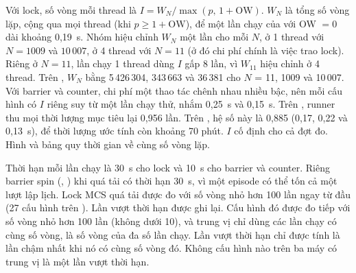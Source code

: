 Với lock, số vòng mỗi thread là $I = W_N/\max(p,\,1+\mathrm{OW})$. $W_N$ là tổng số vòng lặp, cộng
qua mọi thread (khi $p \ge 1+\mathrm{OW}$), để một lần chạy của  với OW $=0$ dài khoảng
0,19~s. Nhóm hiệu chỉnh $W_N$ một lần cho mỗi $N$, ở 1 thread với $N = 1009$ và $10\,007$, ở 4 thread
với $N=11$ (ở đó chi phí chính là việc trao lock). Riêng ở $N=11$, lần chạy 1 thread dùng $I$ gấp 8
lần, vì $W_{11}$ hiệu chỉnh ở 4 thread. Trên , $W_N$ bằng 5\,426\,304, 343\,663 và
36\,381 cho $N$ = 11, 1009 và 10\,007. Với barrier và counter, chi phí một thao tác chênh nhau nhiều
bậc, nên mỗi cấu hình có $I$ riêng suy từ một lần chạy thử, nhắm 0,25~s và 0,15~s. Trên
, runner thu mọi thời lượng mục tiêu lại 0,956 lần. Trên , hệ số
này là 0,885 (0,17, 0,22 và 0,13~s), để thời lượng ước tính còn khoảng 70 phút. $I$ cố định cho cả
đợt đo. Hình và bảng quy thời gian về cùng số vòng lặp.

Thời hạn mỗi lần chạy là 30~s cho lock và 10~s cho barrier và counter. Riêng barrier spin
(, ) khi quá tải có thời hạn 30~s, vì một episode có thể tốn cả một
lượt lập lịch. Lock MCS quá tải được đo với số vòng nhỏ hơn 100 lần ngay từ đầu (27 cấu hình trên
). Lần vượt thời hạn được ghi lại. Cấu hình đó được đo tiếp với số vòng nhỏ hơn 100
lần (không dưới 10), và trung vị chỉ dùng các lần chạy có cùng số vòng, là số vòng của đa số lần chạy. Lần vượt thời hạn chỉ được tính
là lần chậm nhất khi nó có cùng số vòng đó. Không cấu hình nào trên ba máy có trung vị là một lần vượt
thời hạn.


